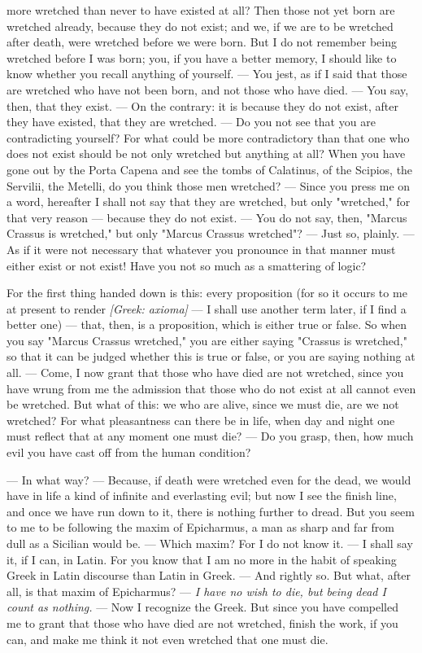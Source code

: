  more wretched than never to have existed at all? Then those not yet born are wretched already, because they do not exist; and we, if we are to be wretched after death, were wretched before we were born. But I do not remember being wretched before I was born; you, if you have a better memory, I should like to know whether you recall anything of yourself. — You jest, as if I said that those are wretched who have not been born, and not those who have died. — You say, then, that they exist. — On the contrary: it is because they do not exist, after they have existed, that they are wretched. — Do you not see that you are contradicting yourself? For what could be more contradictory than that one who does not exist should be not only wretched but anything at all? When you have gone out by the Porta Capena and see the tombs of Calatinus, of the Scipios, the Servilii, the Metelli, do you think those men wretched? — Since you press me on a word, hereafter I shall not say that they are wretched, but only "wretched," for that very reason — because they do not exist. — You do not say, then, "Marcus Crassus is wretched," but only "Marcus Crassus wretched"? — Just so, plainly. — As if it were not necessary that whatever you pronounce in that manner must either exist or not exist! Have you not so much as a smattering of logic?

 For the first thing handed down is this: every proposition (for so it occurs to me at present to render \textit{[Greek: axioma]} — I shall use another term later, if I find a better one) — that, then, is a proposition, which is either true or false. So when you say "Marcus Crassus wretched," you are either saying "Crassus is wretched," so that it can be judged whether this is true or false, or you are saying nothing at all. — Come, I now grant that those who have died are not wretched, since you have wrung from me the admission that those who do not exist at all cannot even be wretched. But what of this: we who are alive, since we must die, are we not wretched? For what pleasantness can there be in life, when day and night one must reflect that at any moment one must die? — Do you grasp, then, how much evil you have cast off from the human condition?

 — In what way? — Because, if death were wretched even for the dead, we would have in life a kind of infinite and everlasting evil; but now I see the finish line, and once we have run down to it, there is nothing further to dread. But you seem to me to be following the maxim of Epicharmus, a man as sharp and far from dull as a Sicilian would be. — Which maxim? For I do not know it. — I shall say it, if I can, in Latin. For you know that I am no more in the habit of speaking Greek in Latin discourse than Latin in Greek. — And rightly so. But what, after all, is that maxim of Epicharmus? — \textit{I have no wish to die, but being dead I count as nothing.} — Now I recognize the Greek. But since you have compelled me to grant that those who have died are not wretched, finish the work, if you can, and make me think it not even wretched that one must die.

